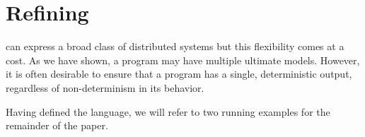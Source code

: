 \section{Refining \large \bf \lang}
\label{sec:confluence}


\lang can express a broad class of distributed systems but this flexibility comes at a cost.
As we have shown, a \lang program may have multiple ultimate models. %
However, it is often desirable to ensure that a program has a single, deterministic output, regardless of non-determinism in its behavior. %

Having defined the \lang language, we will refer to two running examples for the remainder of the paper.  

